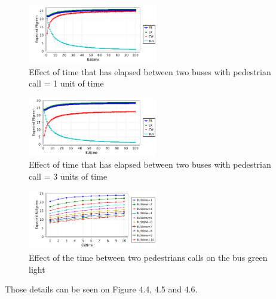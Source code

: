 \begin{figure}[H]\label{fig:cwfirst}
  \centering
    \includegraphics[width=0.5\textwidth]{picture/CWtime1.png}
    \caption{Effect of time that has elapsed between two buses with pedestrian call = 1 unit of time}
\end{figure}

\begin{figure}[H]\label{fig:cwthree}
  \centering
    \includegraphics[width=0.5\textwidth]{picture/CWtime3.png}
    \caption{Effect of time that has elapsed between two buses with pedestrian call = 3 units of time}
\end{figure}

\begin{figure}[H]\label{fig:busbus}
  \centering
    \includegraphics[width=0.5\textwidth]{picture/CWtimeOnBUS.png}
    \caption{Effect of the time between two pedestrians calls on the bus green light}
\end{figure}

Those details can be seen on Figure 4.4, 4.5 and 4.6.

